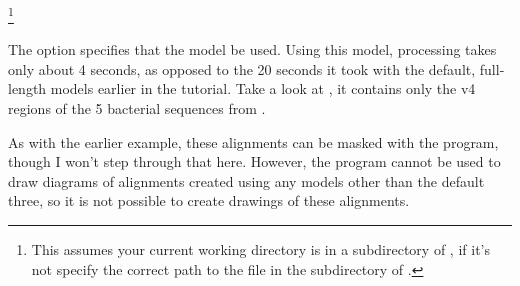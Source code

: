 \footnote{This assumes your
  current working directory is in a subdirectory of ,
  if it's not specify the correct path to the  file
  in the  subdirectory of .}

The  option specifies that the model  be used. 
Using this model, processing  takes only about 4
seconds, as opposed to the 20 seconds it took with the default,
full-length models earlier in the tutorial. Take a look at
, it contains only the v4 regions
of the 5 bacterial sequences from . 

As with the earlier example, these alignments can be masked with the
 program, though I won't step through that
here. However, the  program cannot be used to draw
diagrams of alignments created using any models other than the default
three, so it is not possible to create drawings of these alignments.


